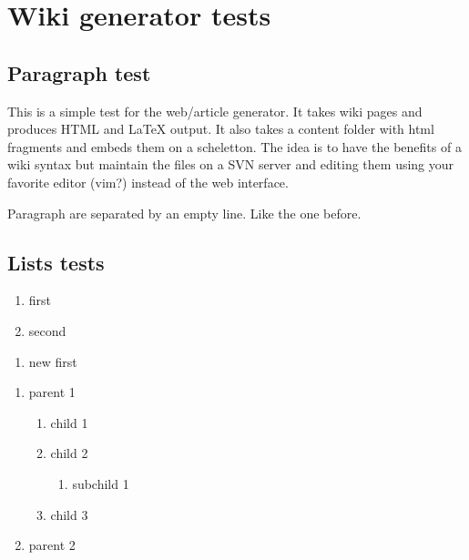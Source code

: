 
\chapter{Wiki generator tests}
\section{Paragraph test}
This is a simple test for the web/article generator.
It takes wiki pages and produces HTML and LaTeX output.
It also takes a content folder with html fragments and
embeds them on a scheletton.
The idea is to have the benefits of a wiki syntax
but maintain the files on a SVN server and editing
them using your favorite editor (vim?) instead of
the web interface.

Paragraph are separated by an empty line.
Like the one before.

\section{Lists tests}


\begin{enumerate}
	\item  first
	\item  second
\end{enumerate}

\begin{enumerate}
	\item  new first
\end{enumerate}

\begin{enumerate}
	\item  parent 1
	\begin{enumerate}
		\item  child 1
		\item  child 2
		\begin{enumerate}
			\item  subchild 1
		\end{enumerate}
		\item  child 3
	\end{enumerate}
	\item  parent 2
\end{enumerate}


